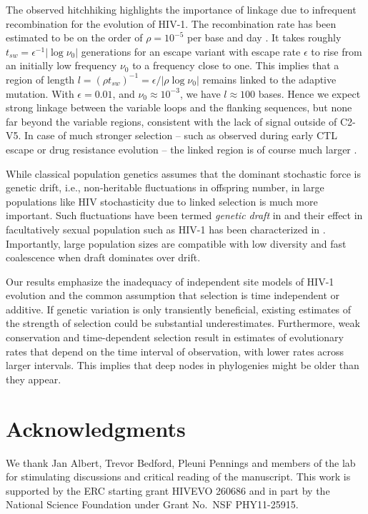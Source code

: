 \documentclass[11pt]{article}
\newcommand{\shankaregion}{C2-V5}
\begin{document}
The observed hitchhiking highlights the importance of linkage due to
infrequent recombination for the evolution of HIV-1. 
The recombination rate has been estimated to be on the
order of $\rho = 10^{-5}$ per base and day
\citep{neher_recombination_2010, batorsky_estimate_2011,
josefsson_majority_2011}. It takes roughly $t_{sw} =
\epsilon^{-1} |\log \nu_0|$ generations for an escape variant with escape rate
$\epsilon$ to rise from an initially low frequency $\nu_0$ to a frequency close to
one. This implies that a region of length $l = (\rho t_{sw})^{-1} = \epsilon /
|\rho \log \nu_0|$ remains linked to the adaptive mutation. With
$\epsilon=0.01$, and $\nu_0\approx 10^{-3}$, 
we have $l\approx 100$ bases. Hence we expect strong linkage between the
variable loops and the flanking sequences, but none far beyond the variable
regions, consistent with the lack of signal outside of \shankaregion. In case of
much stronger selection -- such as observed during early CTL escape or drug
resistance evolution -- the linked region is of course much larger
\citep{nijhuis_stochastic_1998}. 

While classical population genetics assumes that the dominant stochastic force
is genetic drift, i.e., non-heritable fluctuations in offspring number,
in large populations like HIV stochasticity due to linked selection is much more important.
Such fluctuations have been termed \emph{genetic draft} in
\citet{gillespie_genetic_2000} and their effect in facultatively sexual population
such as HIV-1 has been characterized in \citep{neher_genetic_2011}. Importantly,
large population sizes are compatible with low diversity and fast coalescence
when draft dominates over drift.

Our results emphasize the inadequacy of independent site models of HIV-1 evolution
and the common assumption that selection is time independent or additive. 
If genetic variation is only transiently beneficial, existing estimates of the
strength of selection \citep{neher_recombination_2010,batorsky_estimate_2011}
could be substantial underestimates. Furthermore, weak conservation and
time-dependent selection result in estimates of evolutionary 
rates that depend on the time interval of observation, with lower rates across
larger intervals. This implies that deep nodes in phylogenies might be older than 
they appear.


\section*{Acknowledgments}
We thank Jan Albert, Trevor Bedford, Pleuni Pennings and members of the lab for 
stimulating discussions and critical reading of the manuscript.
This work is supported by the ERC starting grant HIVEVO 260686 and 
in part by the National Science Foundation under Grant No.~NSF PHY11-25915.
\end{document}
